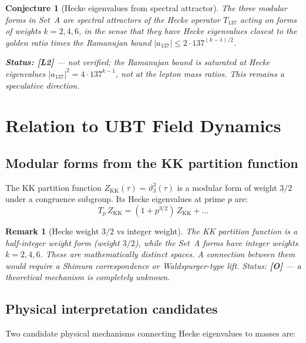 \documentclass[11pt,a4paper]{article}
\newtheorem{remark}{Remark}
\newtheorem{conjecture}{Conjecture}
\begin{document}
\begin{conjecture}[Hecke eigenvalues from spectral attractor]\label{conj:attractor}
  The three modular forms in Set~A are spectral attractors of the Hecke operator
  $T_{137}$ acting on forms of weights $k = 2, 4, 6$, in the sense that they
  have Hecke eigenvalues closest to the golden ratio times the Ramanujan bound
  $|a_{137}| \leq 2 \cdot 137^{(k-1)/2}$.

  \textbf{Status: [L2]} — not verified; the Ramanujan bound is saturated at
  Hecke eigenvalues $|a_{137}|^2 = 4 \cdot 137^{k-1}$, not at the lepton
  mass ratios.  This remains a speculative direction.
\end{conjecture}

\section{Relation to UBT Field Dynamics}
\label{sec:dynamics}

\subsection{Modular forms from the KK partition function}

The KK partition function $Z_{\mathrm{KK}}(\tau) = \vartheta_3^3(\tau)$ is
a modular form of weight $3/2$ under a congruence subgroup.  Its Hecke
eigenvalues at prime $p$ are:
\begin{equation}
  T_p\, Z_{\mathrm{KK}} = (1 + p^{3/2})\, Z_{\mathrm{KK}} + \ldots
\end{equation}

\begin{remark}[Hecke weight $3/2$ vs integer weight]
  The KK partition function is a half-integer weight form (weight $3/2$),
  while the Set~A forms have integer weights $k = 2, 4, 6$.  These are
  mathematically distinct spaces.  A connection between them would require
  a Shimura correspondence or Waldspurger-type lift.
  Status: \textbf{[O]} — a theoretical mechanism is completely unknown.
\end{remark}

\subsection{Physical interpretation candidates}

Two candidate physical mechanisms connecting Hecke eigenvalues to masses are:
\end{document}
